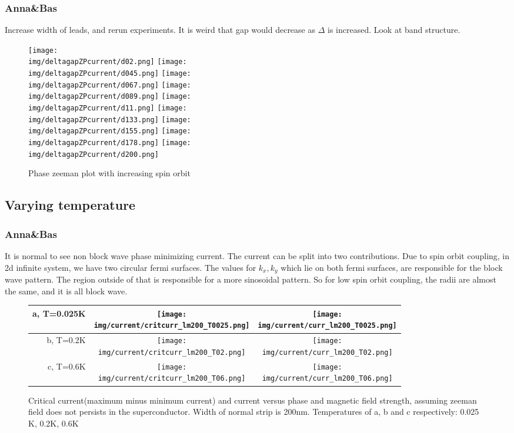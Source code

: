 \documentclass[10pt,a4paper]{article}
\newcommand{\kx}{k_x}
\newcommand{\ky}{k_y}
\newcommand{\img}{./images}
\begin{document}
	\subsubsection{Anna\&Bas}
	Increase width of leads, and rerun experiments. It is weird that gap would decrease as $\Delta$ is increased. Look at band structure.
		\begin{figure}[H]
			\texttt{[image: \\img/deltagapZPcurrent/d02.png]}
			\texttt{[image: \\img/deltagapZPcurrent/d045.png]}
			\texttt{[image: \\img/deltagapZPcurrent/d067.png]}
			\texttt{[image: \\img/deltagapZPcurrent/d089.png]}
			\texttt{[image: \\img/deltagapZPcurrent/d11.png]}
			\texttt{[image: \\img/deltagapZPcurrent/d133.png]}
			\texttt{[image: \\img/deltagapZPcurrent/d155.png]}
			\texttt{[image: \\img/deltagapZPcurrent/d178.png]}
			\texttt{[image: \\img/deltagapZPcurrent/d200.png]}
			\caption{Phase zeeman plot with increasing spin orbit}
		\end{figure}
\newpage
	\subsection{Varying temperature}
	\subsubsection{Anna\&Bas}
	It is normal to see non block wave phase minimizing current. The current can be split into two contributions. 
	Due to spin orbit coupling, in 2d infinite system, we have two circular fermi surfaces. The values for $\kx,\ky$ which lie on both fermi surfaces, are responsible for the block wave pattern. The region outside of that is responsible for a more sinosoidal pattern.
	So for low spin orbit coupling, the radii are almost the same, and it is all block wave.
		\begin{figure}[H]
			\begin{tabular}{rcc}
				a, T=0.025K&\texttt{[image: \\img/current/critcurr\_lm200\_T0025.png]}&
				\texttt{[image: \\img/current/curr\_lm200\_T0025.png]}\\
				\hline
				b, T=0.2K&\texttt{[image: \\img/current/critcurr\_lm200\_T02.png]}&
				\texttt{[image: \\img/current/curr\_lm200\_T02.png]}\\
				\hline
				c, T=0.6K&\texttt{[image: \\img/current/critcurr\_lm200\_T06.png]}&
				\texttt{[image: \\img/current/curr\_lm200\_T06.png]}\\
				\hline
			\end{tabular}
			\caption{Critical current(maximum minus minimum current) and current versus phase and magnetic field strength, assuming zeeman field does not persists in the superconductor. Width of normal strip is 200nm. Temperatures of a, b and c respectively: 0.025 K, 0.2K, 0.6K}
		\end{figure}
	
\end{document}
